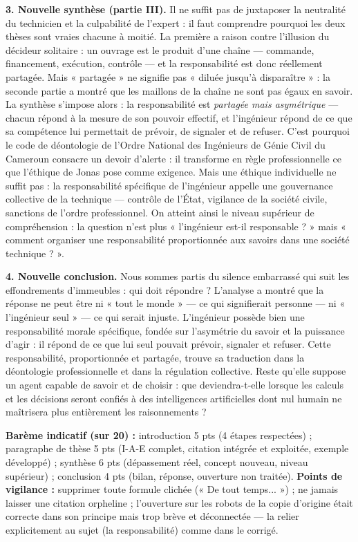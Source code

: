 \documentclass[11pt]{article}
\begin{document}
\begin{corrige}
\textbf{3. Nouvelle synthèse (partie III).} Il ne suffit pas de juxtaposer la neutralité du technicien et la culpabilité de l'expert : il faut comprendre pourquoi les deux thèses sont vraies chacune à moitié. La première a raison contre l'illusion du décideur solitaire : un ouvrage est le produit d'une chaîne — commande, financement, exécution, contrôle — et la responsabilité est donc réellement partagée. Mais « partagée » ne signifie pas « diluée jusqu'à disparaître » : la seconde partie a montré que les maillons de la chaîne ne sont pas égaux en savoir. La synthèse s'impose alors : la responsabilité est \emph{partagée mais asymétrique} — chacun répond à la mesure de son pouvoir effectif, et l'ingénieur répond de ce que sa compétence lui permettait de prévoir, de signaler et de refuser. C'est pourquoi le code de déontologie de l'Ordre National des Ingénieurs de Génie Civil du Cameroun consacre un devoir d'alerte : il transforme en règle professionnelle ce que l'éthique de Jonas pose comme exigence. Mais une éthique individuelle ne suffit pas : la responsabilité spécifique de l'ingénieur appelle une gouvernance collective de la technique — contrôle de l'État, vigilance de la société civile, sanctions de l'ordre professionnel. On atteint ainsi le niveau supérieur de compréhension : la question n'est plus « l'ingénieur est-il responsable ? » mais « comment organiser une responsabilité proportionnée aux savoirs dans une société technique ? ».\par
\textbf{4. Nouvelle conclusion.} Nous sommes partis du silence embarrassé qui suit les effondrements d'immeubles : qui doit répondre ? L'analyse a montré que la réponse ne peut être ni « tout le monde » — ce qui signifierait personne — ni « l'ingénieur seul » — ce qui serait injuste. L'ingénieur possède bien une responsabilité morale spécifique, fondée sur l'asymétrie du savoir et la puissance d'agir : il répond de ce que lui seul pouvait prévoir, signaler et refuser. Cette responsabilité, proportionnée et partagée, trouve sa traduction dans la déontologie professionnelle et dans la régulation collective. Reste qu'elle suppose un agent capable de savoir et de choisir : que deviendra-t-elle lorsque les calculs et les décisions seront confiés à des intelligences artificielles dont nul humain ne maîtrisera plus entièrement les raisonnements ?\par
\textbf{Barème indicatif (sur 20) :} introduction 5 pts (4 étapes respectées) ; paragraphe de thèse 5 pts (I-A-E complet, citation intégrée et exploitée, exemple développé) ; synthèse 6 pts (dépassement réel, concept nouveau, niveau supérieur) ; conclusion 4 pts (bilan, réponse, ouverture non traitée).
\textbf{Points de vigilance :} supprimer toute formule clichée (« De tout temps... ») ; ne jamais laisser une citation orpheline ; l'ouverture sur les robots de la copie d'origine était correcte dans son principe mais trop brève et déconnectée — la relier explicitement au sujet (la responsabilité) comme dans le corrigé.
\end{corrige}
\end{document}
